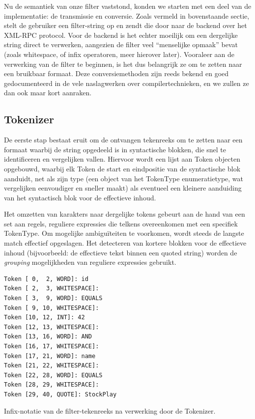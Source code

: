 Nu de semantiek van onze filter vaststond, konden we starten met een deel van de implementatie: de transmissie en conversie.
Zoals vermeld in bovenstaande sectie, stelt de gebruiker een filter-string op en zendt die door naar de backend over het XML-RPC protocol. Voor de backend is het echter moeilijk om een dergelijke string direct te verwerken, aangezien de filter veel ``menselijke opmaak'' bevat (zoals whitespace, of infix operatoren, meer hierover later). Vooraleer aan de verwerking van de filter te beginnen, is het dus belangrijk ze om te zetten naar een bruikbaar formaat.
Deze conversiemethoden zijn reeds bekend en goed gedocumenteerd in de vele naslagwerken over compilertechnieken, en we zullen ze dan ook maar kort aanraken.

\subsection{Tokenizer}

De eerste stap bestaat eruit om de ontvangen tekenreeks om te zetten naar een formaat waarbij de string opgedeeld is in syntactische blokken, die snel te identificeren en vergelijken vallen. Hiervoor wordt een lijst aan Token objecten opgebouwd, waarbij elk Token de start en eindpositie van de syntactische blok aanduidt, net als zijn type (een object van het TokenType enumeratietype, wat vergelijken eenvoudiger en sneller maakt) als eventueel een kleinere aanduiding van het syntactisch blok voor de effectieve inhoud.

Het omzetten van karakters naar dergelijke tokens gebeurt aan de hand van een set aan regels, reguliere expressies die telkens overeenkomen met een specifiek TokenType. Om mogelijke ambigu\"iteiten te voorkomen, wordt steeds de langste match effectief opgeslagen. Het detecteren van kortere blokken voor de effectieve inhoud (bijvoorbeeld: de effectieve tekst binnen een quoted string) worden de \emph{grouping} mogelijkheden van reguliere expressies gebruikt.

\begin{code}
\begin{verbatim}
Token [ 0,  2, WORD]: id
Token [ 2,  3, WHITESPACE]:  
Token [ 3,  9, WORD]: EQUALS
Token [ 9, 10, WHITESPACE]:  
Token [10, 12, INT]: 42
Token [12, 13, WHITESPACE]:  
Token [13, 16, WORD]: AND
Token [16, 17, WHITESPACE]:  
Token [17, 21, WORD]: name
Token [21, 22, WHITESPACE]:  
Token [22, 28, WORD]: EQUALS
Token [28, 29, WHITESPACE]:  
Token [29, 40, QUOTE]: StockPlay
\end{verbatim}
\caption{Infix-notatie van de filter-tekenreeks na verwerking door de Tokenizer.}
\end{code}

